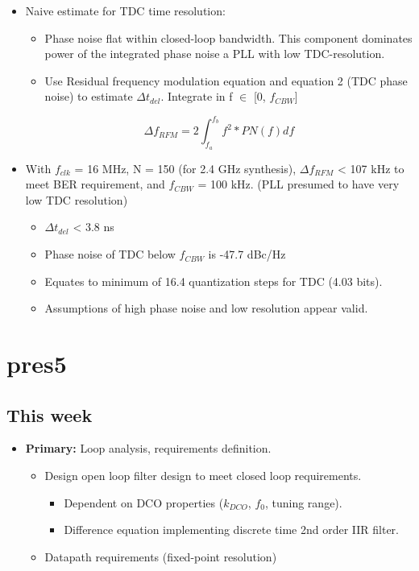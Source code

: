 \documentclass[10pt,a4paper]{article}
\begin{document}
		\begin{itemize}
			\footnotesize
			\item Naive estimate for TDC time resolution:
			\begin{itemize}
				\scriptsize
				\item Phase noise flat within closed-loop bandwidth. This component dominates power of the integrated phase noise a PLL with low TDC-resolution.
				\item Use Residual frequency modulation equation and equation 2 (TDC phase noise) to estimate $\Delta t_{del}$. Integrate in f $\in$ [0, $f_{CBW}$]
			\end{itemize} 
			\begin{equation}
				\Delta f_{RFM} = 2\int_{f_a}^{f_b}f^2*PN(f)df
			\end{equation}
			\item With $f_{clk}$ = 16 MHz, N = 150 (for 2.4 GHz synthesis), $\Delta f_{RFM}$ < 107 kHz to meet BER requirement, and $f_{CBW}$ = 100 kHz. (PLL presumed to have very low TDC resolution)
 			\begin{itemize}
				\scriptsize			
				\item $\Delta t_{del}$ < 3.8 ns
				\item Phase noise of TDC below $f_{CBW}$ is -47.7 dBc/Hz
				\item Equates to minimum of 16.4 quantization steps for TDC (4.03 bits).
				\item Assumptions of high phase noise and low resolution appear valid.

			\end{itemize} 
		\end{itemize}  

	\section{pres5}
		\flushleft
		\subsection{This week}
		\begin{itemize}
			\footnotesize
			\item \textbf{Primary:} Loop analysis, requirements definition.
			\begin{itemize}
				\footnotesize
				\item Design open loop filter design to meet closed loop requirements.
				\begin{itemize}
					\item Dependent on DCO properties ($k_{DCO}$, $f_0$, tuning range).
					\item Difference equation implementing discrete time 2nd order IIR filter.
				\end{itemize} 
				\item Datapath requirements (fixed-point resolution)
			\end{itemize} 
		\end{itemize}  
		\flushleft
\end{document}
